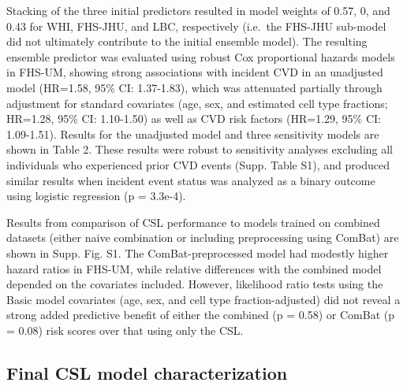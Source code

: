 \documentclass[]{article}
\begin{document}
Stacking of the three initial predictors resulted in model weights of
0.57, 0, and 0.43 for WHI, FHS-JHU, and LBC, respectively (i.e.~the
FHS-JHU sub-model did not ultimately contribute to the initial ensemble
model). The resulting ensemble predictor was evaluated using robust Cox
proportional hazards models in FHS-UM, showing strong associations with
incident CVD in an unadjusted model (HR=1.58, 95\% CI: 1.37-1.83), which
was attenuated partially through adjustment for standard covariates
(age, sex, and estimated cell type fractions; HR=1.28, 95\% CI:
1.10-1.50) as well as CVD risk factors (HR=1.29, 95\% CI: 1.09-1.51).
Results for the unadjusted model and three sensitivity models are shown
in Table 2. These results were robust to sensitivity analyses excluding
all individuals who experienced prior CVD events (Supp. Table S1), and
produced similar results when incident event status was analyzed as a
binary outcome using logistic regression (p = 3.3e-4).

Results from comparison of CSL performance to models trained on combined
datasets (either naive combination or including preprocessing using
ComBat) are shown in Supp. Fig. S1. The ComBat-preprocessed model had
modestly higher hazard ratios in FHS-UM, while relative differences with
the combined model depended on the covariates included. However,
likelihood ratio tests using the Basic model covariates (age, sex, and
cell type fraction-adjusted) did not reveal a strong added predictive
benefit of either the combined (p = 0.58) or ComBat (p = 0.08) risk
scores over that using only the CSL.

\hypertarget{final-csl-model-characterization}{%
\subsection{Final CSL model
characterization}\label{final-csl-model-characterization}}
\end{document}
